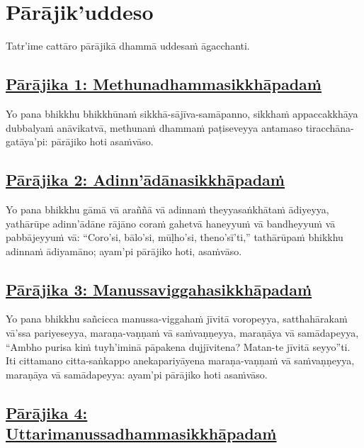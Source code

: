 \section{Pārājik'uddeso}
\label{par}

\begin{intro}
  Tatr'ime cattāro pārājikā dhammā uddesaṁ āgacchanti.
\end{intro}

\setsubsecheadstyle{\subsubsectionFmt}
\subsection*{\hyperref[disq1]{Pārājika 1: Methunadhammasikkhāpadaṁ}}
\label{par1}

Yo pana bhikkhu bhikkhūnaṁ sikkhā-sājīva-samāpanno, sikkhaṁ appaccakkhāya dubbalyaṁ anāvikatvā, methunaṁ dhammaṁ paṭiseveyya antamaso tiracchāna-gatāya'pi: pārājiko hoti asaṁvāso.

\subsection*{\hyperref[disq2]{Pārājika 2: Adinn'ādānasikkhāpadaṁ}}
\label{par2}

Yo pana bhikkhu gāmā vā araññā vā adinnaṁ theyyasaṅkhātaṁ ādiyeyya, yathārūpe adinn'ādāne rājāno coraṁ gahetvā haneyyuṁ vā bandheyyuṁ vā pabbājeyyuṁ vā: ``Coro'si, bālo'si, mūḷho'si, theno'sī'ti,'' tathārūpaṁ bhikkhu adinnaṁ ādiyamāno; ayam'pi pārājiko hoti, asaṁvāso.

\subsection*{\hyperref[disq3]{Pārājika 3: Manussaviggahasikkhāpadaṁ}}
\label{par3}

Yo pana bhikkhu sañcicca manussa-viggahaṁ jīvitā voropeyya, satthahārakaṁ vā'ssa pariyeseyya, maraṇa-vaṇṇaṁ vā saṁvaṇṇeyya, maraṇāya vā samādapeyya, “Ambho purisa kiṁ tuyh'iminā pāpakena dujjīvitena? Matan-te jīvitā seyyo”ti. Iti cittamano citta-saṅkappo anekapariyāyena maraṇa-vaṇṇaṁ vā saṁvaṇṇeyya, maraṇāya vā samādapeyya: ayam'pi pārājiko hoti asaṁvāso.

\subsection*{\hyperref[disq4]{Pārājika 4: Uttarimanussadhammasikkhāpadaṁ}}
\label{par4}

